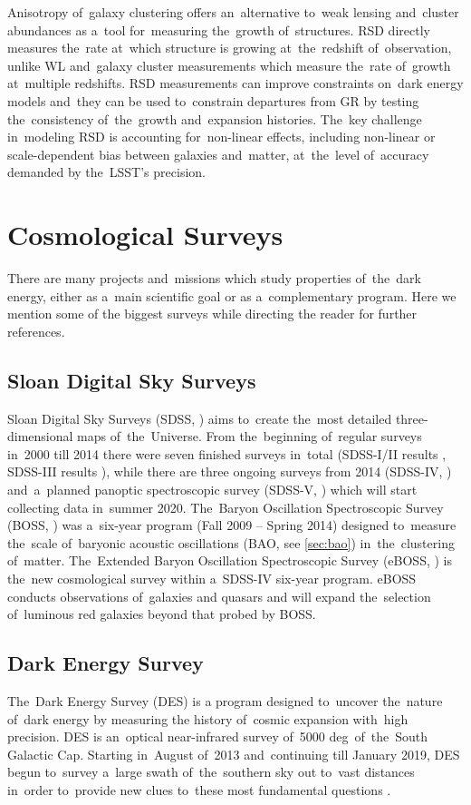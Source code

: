 Anisotropy of~galaxy clustering offers an~alternative to~weak lensing and~cluster abundances as a~tool for~measuring the~growth of~structures. RSD directly measures the~rate at~which structure is growing at~the~redshift of~observation, unlike WL and~galaxy cluster measurements which measure the~rate of~growth at~multiple redshifts. RSD measurements can improve constraints on~dark energy models and~they can be used to~constrain departures from GR by testing the~consistency of~the~growth and~expansion histories. The~key challenge in~modeling RSD is accounting for~non-linear effects, including non-linear or scale-dependent bias between galaxies and~matter, at~the~level of~accuracy demanded by the~LSST's precision. 
\section{Cosmological Surveys}
There are many projects and~missions which study properties of~the~dark energy, either as a~main scientific goal or as a~complementary program. Here we mention some of the biggest surveys while directing the reader for further references.
\subsection{Sloan Digital Sky Surveys}
Sloan Digital Sky Surveys (SDSS, \cite{SDSS}) aims to~create the~most detailed three-dimensional maps of~the~Universe. From the~beginning of~regular surveys in~2000 till 2014 there were seven finished surveys in~total (SDSS-I/II results \cite{SDSS_I_II}, SDSS-III results \cite{BOSS_results}), while there are three ongoing surveys from 2014 (SDSS-IV, \cite{2017AJ....154...28B}) and~a~planned panoptic spectroscopic survey (SDSS-V, \cite{2017arXiv171103234K}) which will start collecting data in~summer 2020. The~Baryon Oscillation Spectroscopic Survey (BOSS, \cite{BOSS}) was a~six-year program (Fall 2009 -- Spring 2014) designed to~measure the~scale of~baryonic acoustic oscillations (BAO, see \autoref{sec:bao}) in~the~clustering of~matter. The~Extended Baryon Oscillation Spectroscopic Survey (eBOSS, \cite{2016AJ....151...44D}) is the~new cosmological survey within a~SDSS-IV six-year program. eBOSS conducts observations of~galaxies and quasars and will expand the~selection of~luminous red galaxies beyond that probed by BOSS.
\subsection{Dark Energy Survey}
The~Dark Energy Survey (DES) is a program designed to~uncover the~nature of~dark energy by measuring the history of~cosmic expansion with~high precision. DES is an~optical near-infrared survey of~5000 deg\sq\ of~the~South Galactic Cap. Starting in~August of~2013 and~continuing till January 2019, DES begun to~survey a~large swath of~the~southern sky out to~vast distances in~order to~provide new clues to~these most fundamental questions \parencite{DES}.
